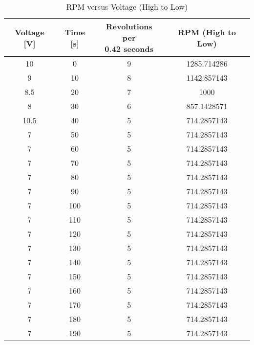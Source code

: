 \documentclass[12pt,a4paper]{report}
\begin{document}
\begin{table}[htbp]
\centering
\caption{RPM versus Voltage (High to Low)}\label{tab:rpm_voltage_high_to_low}
\begin{tabular}{cccc}
\toprule
	\textbf{Voltage [V]} & \textbf{Time [s]} & \makecell[c]{\textbf{Revolutions per}\\\textbf{0.42 seconds}} & \textbf{RPM (High to Low)} \\
\midrule
10    & 0    & 9  & 1285.714286 \\
9     & 10   & 8  & 1142.857143 \\
8.5   & 20   & 7  & 1000 \\
8     & 30   & 6  & 857.1428571 \\
10.5  & 40   & 5  & 714.2857143 \\
7     & 50   & 5  & 714.2857143 \\
7     & 60   & 5  & 714.2857143 \\
7     & 70   & 5  & 714.2857143 \\
7     & 80   & 5  & 714.2857143 \\
7     & 90   & 5  & 714.2857143 \\
7     & 100  & 5  & 714.2857143 \\
7     & 110  & 5  & 714.2857143 \\
7     & 120  & 5  & 714.2857143 \\
7     & 130  & 5  & 714.2857143 \\
7     & 140  & 5  & 714.2857143 \\
7     & 150  & 5  & 714.2857143 \\
7     & 160  & 5  & 714.2857143 \\
7     & 170  & 5  & 714.2857143 \\
7     & 180  & 5  & 714.2857143 \\
7     & 190  & 5  & 714.2857143 \\
\bottomrule
\end{tabular}
\end{table}
\end{document}

